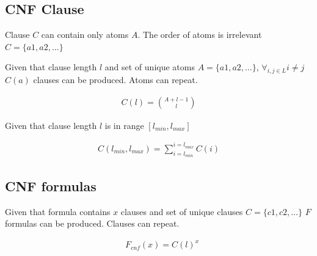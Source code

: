 %
%

\subsection{CNF Clause}

Clause $C$ can contain only atoms $A$. The order of atoms is irrelevant $C = \{a1, a2, \dots\}$

Given that 
clause length $l$ and 
set of unique atoms $A = \{a1, a2, \dots\}$, $\forall_{i,j \in L} i \neq j$
$C(a)$ clauses can be produced. Atoms can repeat.

\begin{align}
  C(l) = \binom{A + l - 1}{l}
\end{align}

Given that clause length $l$ is in range $[l_{min}, l_{max}]$

\begin{align}
  C(l_{min}, l_{max}) = \sum_{i=l_{min}}^{i=l_{max}} C(i) \label{eq:clause}
\end{align}

\subsection{CNF formulas}

Given that
formula contains $x$ clauses and
set of unique clauses $C = \{c1,c2, \dots\}$
$F$ formulas can be produced. Clauses can repeat.

\begin{align}
  &F_{cnf}(x) = C(l)^{x} \label{eq:cnfformula}
\end{align}

